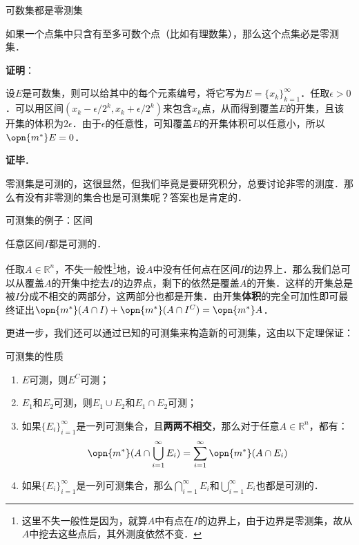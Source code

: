 \begin{theorem}{可数集都是零测集}\label{MsbSet_the4}

如果一个点集中只含有至多可数个点（比如有理数集），那么这个点集必是零测集．

\end{theorem}

\textbf{证明}：

设$E$是可数集，则可以给其中的每个元素编号，将它写为$E=\{x_k\}_{k=1}^\infty$．任取$\epsilon>0$．可以用区间$(x_k-\epsilon/2^k, x_k+\epsilon/2^k)$来包含$x_k$点，从而得到覆盖$E$的开集，且该开集的体积为$2\epsilon$．由于$\epsilon$的任意性，可知覆盖$E$的开集体积可以任意小，所以$\opn{m^*}E=0$．

\textbf{证毕}．

零测集是可测的，这很显然，但我们毕竟是要研究积分，总要讨论非零的测度．那么有没有非零测的集合也是可测集呢？答案也是肯定的．

\begin{example}{可测集的例子：区间}\label{MsbSet_ex1}

任意区间$I$都是可测的．

任取$A\in\mathbb{R}^n$，不失一般性\footnote{这里不失一般性是因为，就算$A$中有点在$I$的边界上，由于边界是零测集，故从$A$中挖去这些点后，其外测度依然不变．}地，设$A$中没有任何点在区间$I$的边界上．那么我们总可以从覆盖$A$的开集中挖去$I$的边界点，剩下的依然是覆盖$A$的开集．这样的开集总是被$I$分成不相交的两部分，这两部分也都是开集．由开集\textbf{体积}的完全可加性即可最终证出$\opn{m^*}(A\cap I)+\opn{m^*}(A\cap I^C)=\opn{m^*}A$．

\end{example}

更进一步，我们还可以通过已知的可测集来构造新的可测集，这由以下定理保证：

\begin{theorem}{可测集的性质}\label{MsbSet_the1}

\begin{enumerate}
\item $E$可测，则$E^C$可测；
\item $E_1$和$E_2$可测，则$E_1\cup E_2$和$E_1\cap E_2$可测；
\item 如果$\{E_i\}_{i=1}^{\infty}$是一列可测集合，且\textbf{两两不相交}，那么对于任意$A\in\mathbb{R}^n$，都有：
\begin{equation}\label{MsbSet_eq4}
\opn{m^*}(A\cap \bigcup_{i=1}^{\infty}E_i)=\sum_{i=1}^{\infty}\opn{m^*}(A\cap E_i)
\end{equation}
\item 如果$\{E_i\}_{i=1}^{\infty}$是一列可测集合，那么$\bigcap_{i=1}^{\infty}E_i$和$\bigcup_{i=1}^{\infty}E_i$也都是可测的．
\end{enumerate}

\end{theorem}

